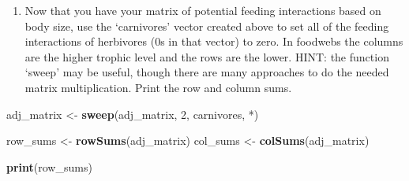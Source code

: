 \documentclass[
]{article}
\newenvironment{Shaded}{\begin{snugshade}}{\end{snugshade}}
\newcommand{\AttributeTok}[1]{\textcolor[rgb]{0.13,0.29,0.53}{#1}}
\newcommand{\DecValTok}[1]{\textcolor[rgb]{0.00,0.00,0.81}{#1}}
\newcommand{\FunctionTok}[1]{\textcolor[rgb]{0.13,0.29,0.53}{\textbf{#1}}}
\newcommand{\NormalTok}[1]{#1}
\newcommand{\OtherTok}[1]{\textcolor[rgb]{0.56,0.35,0.01}{#1}}
\newcommand{\StringTok}[1]{\textcolor[rgb]{0.31,0.60,0.02}{#1}}
\providecommand{\tightlist}{%
  \setlength{\itemsep}{0pt}\setlength{\parskip}{0pt}}
\begin{document}
\begin{enumerate}
\def\labelenumi{\alph{enumi}.}
\setcounter{enumi}{3}
\tightlist
\item
  Now that you have your matrix of potential feeding interactions based
  on body size, use the `carnivores' vector created above to set all of
  the feeding interactions of herbivores (0s in that vector) to zero. In
  foodwebs the columns are the higher trophic level and the rows are the
  lower. HINT: the function `sweep' may be useful, though there are many
  approaches to do the needed matrix multiplication. Print the row and
  column sums.
\end{enumerate}

\begin{Shaded}
\begin{Highlighting}[]
\NormalTok{adj\_matrix }\OtherTok{\textless{}{-}} \FunctionTok{sweep}\NormalTok{(adj\_matrix, }\DecValTok{2}\NormalTok{, carnivores, }\StringTok{\textasciigrave{}}\AttributeTok{*}\StringTok{\textasciigrave{}}\NormalTok{)}

\NormalTok{row\_sums }\OtherTok{\textless{}{-}} \FunctionTok{rowSums}\NormalTok{(adj\_matrix)}
\NormalTok{col\_sums }\OtherTok{\textless{}{-}} \FunctionTok{colSums}\NormalTok{(adj\_matrix)}

\FunctionTok{print}\NormalTok{(row\_sums)}
\end{Highlighting}
\end{Shaded}
\end{document}
